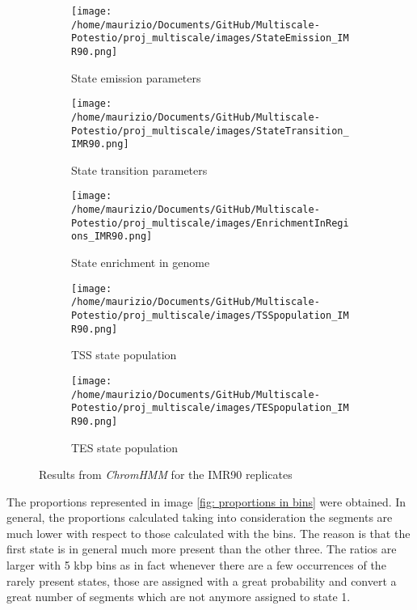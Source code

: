 \begin{figure}[H]
    \centering
    \begin{subfigure}[t]{0.065\textwidth}
      \texttt{[image: /home/maurizio/Documents/GitHub/Multiscale-Potestio/proj\_multiscale/images/StateEmission\_IMR90.png]}
      \caption{State emission parameters}
      \label{fig:State emission parameters}
  \end{subfigure}
  \begin{subfigure}[t]{0.11\textwidth}
      \texttt{[image: /home/maurizio/Documents/GitHub/Multiscale-Potestio/proj\_multiscale/images/StateTransition\_IMR90.png]}
      \caption{State transition parameters}
      \label{fig:State transition parameters}
  \end{subfigure}
  \begin{subfigure}[t]{0.15\textwidth}
      \texttt{[image: /home/maurizio/Documents/GitHub/Multiscale-Potestio/proj\_multiscale/images/EnrichmentInRegions\_IMR90.png]}
      \caption{State enrichment in genome}
      \label{fig:State enrichment in genome}
  \end{subfigure}
    \hspace{0.6\textwidth}
    \begin{subfigure}{0.39\textwidth}
      \texttt{[image: /home/maurizio/Documents/GitHub/Multiscale-Potestio/proj\_multiscale/images/TSSpopulation\_IMR90.png]}
      \caption{TSS state population}
      \label{fig:TSS state population}
    \end{subfigure}
    \begin{subfigure}{0.39\textwidth}
      \texttt{[image: /home/maurizio/Documents/GitHub/Multiscale-Potestio/proj\_multiscale/images/TESpopulation\_IMR90.png]}
      \caption{TES state population}
      \label{fig:TES state population}
    \end{subfigure}
  
    \caption{Results from \textit{ChromHMM} for the IMR90 replicates}
    \label{fig:ChromHMM results}
\end{figure}


The proportions represented in image \ref{fig: proportions in bins} were obtained. In general, the proportions calculated taking into consideration the segments are much lower with respect to those calculated with the bins. The reason is that the first state is in general much more present than the other three. The ratios are larger with 5 kbp bins as in fact whenever there are a few occurrences of the rarely present states, those are assigned with a great probability and convert a great number of segments which are not anymore assigned to state 1.

